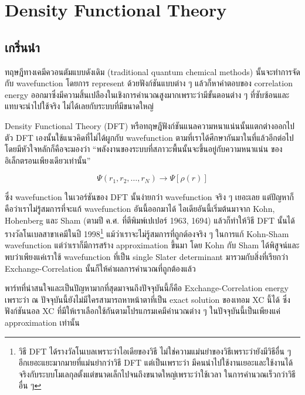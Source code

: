 
\chapter{Density Functional Theory}

\section{เกริ่นนำ}

ทฤษฎีทางเคมีควอนตัมแบบดังเดิม (traditional quantum chemical methods) นั้นจะทำการจัดกับ
wavefunction โดยการ represent ด้วยฟังก์ชันแบบต่าง ๆ แล้วก็หาคำตอบของ correlation energy
ออกมาซึ่งมีความสิ้นเปลืองในเชิงการคำนวณสูงมากเพราะว่ามีขั้นตอนต่าง ๆ ที่ซับซ้อนและแทบจะนำไปใช้จริง%
ไม่ได้เลยกับระบบที่มีขนาดใหญ่

Density Functional Theory (DFT) หรือทฤษฎีฟังก์ชันแนลความหนาแน่นนั้นแตกต่างออกไป
ตัว DFT เองนั้นใช้แนวคิดที่ไม่ได้ผูกกับ wavefunction ตามที่เราได้ศึกษากันมาในที่แล้วอีกต่อไป
โดยมีหัวใจหลักก็คือจะมองว่า \enquote{พลังงานของระบบที่สภาวะพื้นนั้นจะขึ้นอยู่กับความหนาแน่น%
    ของอิเล็กตรอนเพียงเดียวเท่านั้น}

\begin{equation}
    \Psi(r_{1}, r_{2}, \dots, r_{N}) \rightarrow \Psi[\rho(r)]
\end{equation}

ซึ่ง wavefunction ในเวอร์ชันของ DFT นั้นง่ายกว่า wavefunction จริง ๆ เยอะเลย
แต่ปัญหาก็คือว่าเราไม่รู้สมการที่จะแก้ wavefunction อันนี้ออกมาได้ ไอเดียอันนี้เริ่มต้นมาจาก
Kohn, Hohenberg และ Sham (ตามปี ค.ศ. ที่ตีพิมพ์เปเปอร์ 1963, 1694) แล้วก็ทำให้วิธี
DFT นั้นได้รางวัลโนเบลสาขาเคมีในปี 1998\footnote{วิธี DFT ได้รางวัลโนเบลเพราะว่าไอเดียของวิธี
    ไม่ใช่ความแม่นยำของวิธีเพราะว่ายังมีวิธีอื่น ๆ อีกเยอะแยะมากมายที่แม่นยำกว่าวิธี DFT แต่เป็นเพราะว่า%
    มีคนนำไปใช้งานเยอะและใช้งานได้จริงกับระบบโมเลกุลตั้งแต่ขนาดเล็กไปจนถึงขนาดใหญ่เพราะว่าใช้เวลา%
    ในการคำนวณเร็วกว่าวิธีอื่น ๆ} แม้ว่าเราจะไม่รู้สมการที่ถูกต้องจริง ๆ ในการแก้ Kohn-Sham wavefunction
แต่ว่าเราก็มีการสร้าง approximation ขึ้นมา โดย Kohn กับ Sham ได้พิสูจน์และพบว่าเพียงแค่เราใช้
wavefunction ที่เป็น single Slater determinant มารวมกับสิ่งที่เรียกว่า Exchange-Correlation
นั้นก็ให้ค่าผลการคำนวณที่ถูกต้องแล้ว

พาร์ทที่น่าสนใจและเป็นปัญหามากที่สุดมาจนถึงปัจจุบันนี้ก็คือ Exchange-Correlation energy เพราะว่า ณ
ปัจจุบันนี้ยังไม่มีใครสามารถหาหน้าตาที่เป็น exact solution ของเทอม XC นี้ได้ ซึ่งฟังก์ชันนอล XC
ที่มีให้เราเลือกใช้กันตามโปรแกรมเคมีคำนวณต่าง ๆ ในปัจจุบันนี้เป็นเพียงแค่ approximation เท่านั้น

